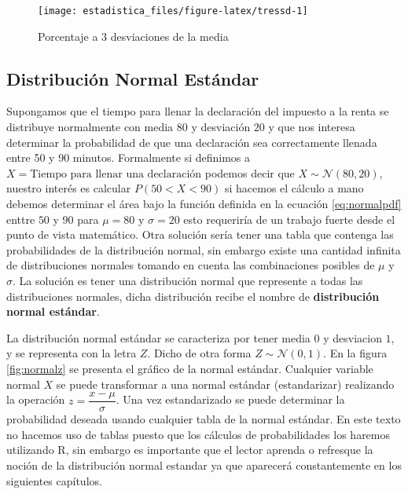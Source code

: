 \documentclass[]{book}
\begin{document}
\begin{figure}[h]

{\centering \texttt{[image: estadistica\_files/figure-latex/tressd-1]} 

}

\caption{Porcentaje a 3 desviaciones de la media}\label{fig:tressd}
\end{figure}

\hypertarget{distribucion-normal-estandar}{%
\subsection{Distribución Normal Estándar}\label{distribucion-normal-estandar}}

Supongamos que el tiempo para llenar la declaración del impuesto a la renta se distribuye normalmente con media \(80\) y desviación \(20\) y que nos interesa determinar la probabilidad de que una declaración sea correctamente llenada entre 50 y 90 minutos. Formalmente si definimos a \(X=\text{Tiempo para llenar una declaración}\) podemos decir que \(X \sim \mathcal{N}\left(80,20\right)\), nuestro interés es calcular \(P\left(50< X <90\right)\) si hacemos el cálculo a mano debemos determinar el área bajo la función definida en la ecuación \eqref{eq:normalpdf} enttre \(50\) y \(90\) para \(\mu=80\) y \(\sigma=20\) esto requeriría de un trabajo fuerte desde el punto de vista matemático. Otra solución sería tener una tabla que contenga las probabilidades de la distribución normal, sin embargo existe una cantidad infinita de distribuciones normales tomando en cuenta las combinaciones posibles de \(\mu\) y \(\sigma\). La solución es tener una distribución normal que represente a todas las distribuciones normales, dicha distribución recibe el nombre de \textbf{distribución normal estándar}.

La distribución normal estándar se caracteriza por tener media \(0\) y desviacion \(1\), y se representa con la letra \(Z\). Dicho de otra forma \(Z \sim \mathcal{N}\left(0,1\right)\). En la figura \ref{fig:normalz} se presenta el gráfico de la normal estándar. Cualquier variable normal \(X\) se puede transformar a una normal estándar (estandarizar) realizando la operación \(z=\dfrac{x-\mu}{\sigma}\). Una vez estandarizado se puede determinar la probabilidad deseada usando cualquier tabla de la normal estándar. En este texto no hacemos uso de tablas puesto que los cálculos de probabilidades los haremos utilizando R, sin embargo es importante que el lector aprenda o refresque la noción de la distribución normal estandar ya que aparecerá constantemente en los siguientes capítulos.
\end{document}
